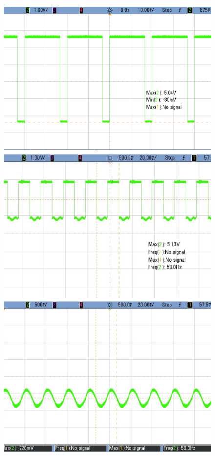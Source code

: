 \begin{figure}[h!]
        \centering
        \includegraphics[scale=0.19]{cmos_cerda2.png}\hspace{1cm}
        \includegraphics[scale=0.2]{cmos_dads.jpeg}\\
		\vspace{0.2cm}
	   \includegraphics[scale=0.19]{cmos_ahifdas.jpeg} 

\end{figure}
